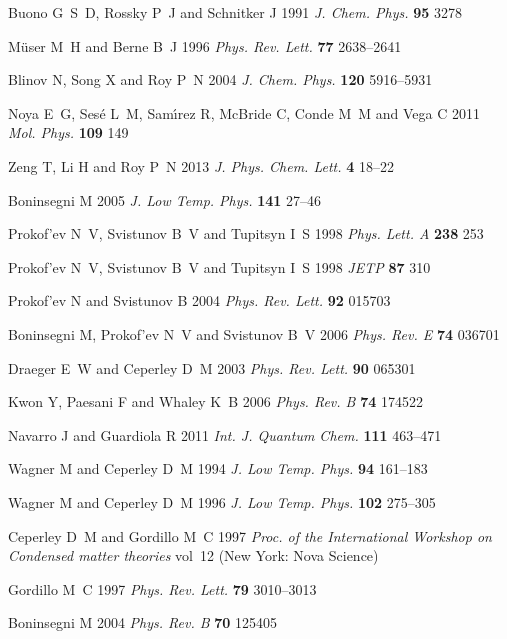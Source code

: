 \documentclass[12pt]{iopart}
\begin{document}
\begin{thebibliography}{100}
Buono G~S~D, Rossky P~J and Schnitker J 1991 {\em J. Chem. Phys.\/} {\bf 95}
  3278

M{\"u}ser M~H and Berne B~J 1996 {\em Phys. Rev. Lett.\/} {\bf 77} 2638--2641

Blinov N, Song X and Roy P~N 2004 {\em J. Chem. Phys.\/} {\bf 120} 5916--5931

Noya E~G, Ses{\'e} L~M, Sam{\'\i}rez R, McBride C, Conde M~M and Vega C 2011
  {\em Mol. Phys.\/} {\bf 109} 149

Zeng T, Li H and Roy P~N 2013 {\em J. Phys. Chem. Lett.\/} {\bf 4} 18--22

Boninsegni M 2005 {\em J. Low Temp. Phys.\/} {\bf 141} 27--46

Prokof'ev N~V, Svistunov B~V and Tupitsyn I~S 1998 {\em Phys. Lett. A\/} {\bf
  238} 253

Prokof'ev N~V, Svistunov B~V and Tupitsyn I~S 1998 {\em JETP\/} {\bf 87} 310

Prokof'ev N and Svistunov B 2004 {\em Phys. Rev. Lett.\/} {\bf 92} 015703

Boninsegni M, Prokof'ev N~V and Svistunov B~V 2006 {\em Phys. Rev. E\/} {\bf
  74} 036701

Draeger E~W and Ceperley D~M 2003 {\em Phys. Rev. Lett.\/} {\bf 90} 065301

Kwon Y, Paesani F and Whaley K~B 2006 {\em Phys. Rev. B\/} {\bf 74} 174522

Navarro J and Guardiola R 2011 {\em Int. J. Quantum Chem.\/} {\bf 111} 463--471

Wagner M and Ceperley D~M 1994 {\em J. Low Temp. Phys.\/} {\bf 94} 161--183

Wagner M and Ceperley D~M 1996 {\em J. Low Temp. Phys.\/} {\bf 102} 275--305

Ceperley D~M and Gordillo M~C 1997 {\em Proc. of the International Workshop on
  Condensed matter theories\/} vol~12 (New York: Nova Science)

Gordillo M~C 1997 {\em Phys. Rev. Lett.\/} {\bf 79} 3010--3013

Boninsegni M 2004 {\em Phys. Rev. B\/} {\bf 70} 125405


\end{thebibliography}
\end{document}
